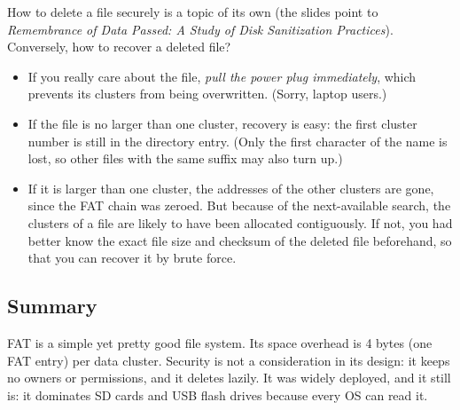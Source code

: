 How to delete a file securely is a topic of its own (the slides point to \emph{Remembrance of Data Passed: A Study of Disk Sanitization Practices}). Conversely, how to recover a deleted file?
\begin{itemize}
  \item If you really care about the file, \emph{pull the power plug immediately}, which prevents its clusters from being overwritten. (Sorry, laptop users.)
  \item If the file is no larger than one cluster, recovery is easy: the first cluster number is still in the directory entry. (Only the first character of the name is lost, so other files with the same suffix may also turn up.)
  \item If it is larger than one cluster, the addresses of the other clusters are gone, since the FAT chain was zeroed. But because of the next-available search, the clusters of a file are likely to have been allocated contiguously. If not, you had better know the exact file size and checksum of the deleted file beforehand, so that you can recover it by brute force.
\end{itemize}

\enlargethispage{\baselineskip}
\subsection{Summary}

FAT is a simple yet pretty good file system. Its space overhead is 4 bytes (one FAT entry) per data cluster. Security is not a consideration in its design: it keeps no owners or permissions, and it deletes lazily. It was widely deployed, and it still is: it dominates SD cards and USB flash drives because every OS can read it.
